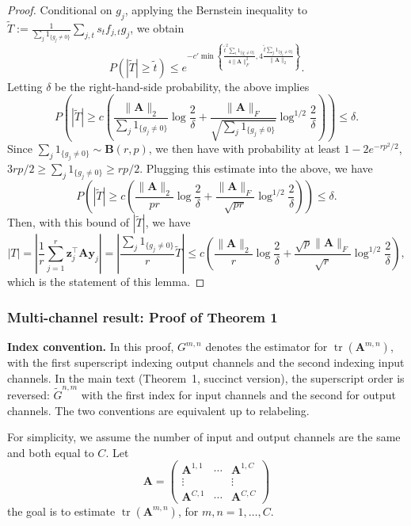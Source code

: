 \documentclass[10pt]{article}
\newcommand{\B}{\mathbf}
\begin{document}
\begin{proof}
Conditional on $g_j$, applying the Bernstein inequality to $\tilde{T}:= \frac{1}{\sum_j 1_{\{g_j\neq 0\}} }\sum_{j,t} s_t f_{j,t} g_j$, we obtain
\[
 P(| \tilde{T}| \geq \tilde{t}) \leq e^{-c'\min\left\{ \frac{\tilde{t}^2\sum_i 1_{\{g_i\neq 0\}}}{4\|\B{A}\|_F^2}, 4\frac{\tilde{t}\sum_j 1_{\{g_j\neq 0\}} }{ \|\B{A}\|_2}\right\}}.
\]
Letting $\delta$ be the right-hand-side probability, the above implies
\[
 P\left(| \tilde{T}| \geq c \left( \frac{\|\B{A}\|_2}{\sum_j 1_{\{g_j\neq 0\}} }\log \frac{2}{\delta} + \frac{\|\B{A}\|_F}{\sqrt {\sum_j 1_{\{g_j\neq 0\}} }}\log^{1/2} \frac{2}{\delta}\right)\right) \leq \delta.
\]
 Since $\sum_j 1_{\{g_j\neq 0\}}\sim \B{B}(r,p)$, we then have with probability at least $1-2e^{-rp^2/2}$, $3rp/2\geq \sum_j 1_{\{g_j\neq 0\}} \geq rp/2$. Plugging this estimate into the above, we have
 \[
 P\left(| \tilde{T}| \geq c \left( \frac{\|\B{A}\|_2}{pr }\log \frac{2}{\delta} + \frac{\|\B{A}\|_F}{\sqrt {pr }}\log^{1/2} \frac{2}{\delta}\right)\right) \leq \delta.
\]
Then, with this bound of $|\tilde{T}|$, we have
\[
|T| = \left|\frac{1}{r} \sum\limits_{j=1}^{r} \B{z}_j^{\top}\B{A}\B{y}_j \right| = \left|\frac{ \sum_j 1_{\{g_j\neq 0\}}}{r} \tilde{T}\right|\leq c\left( \frac{\|\B{A}\|_2}{r }\log \frac{2}{\delta} + \frac{\sqrt p \|\B{A}\|_F}{\sqrt {r }}\log^{1/2} \frac{2}{\delta}\right),
\]
which is the statement of this lemma.
\end{proof}

\subsubsection{Multi-channel result: Proof of Theorem 1}
\textbf{Index convention.} In this proof, $G^{m,n}$ denotes the estimator for $\operatorname{tr}(\B{A}^{m,n})$, with the first superscript indexing output channels and the second indexing input channels. In the main text (Theorem~1, succinct version), the superscript order is reversed: $\widetilde{G}^{n,m}$ with the first index for input channels and the second for output channels. The two conventions are equivalent up to relabeling.

For simplicity, we assume the number of input and output channels are the same and both equal to $C$. Let
\[
\B{A} = \left( \begin{matrix}\B{A}^{1,1} & \cdots& \B{A}^{1,C} \\ \vdots & & \vdots \\ \B{A}^{C,1} & \cdots & \B{A}^{C,C} \end{matrix}\right)
\]
the goal is to estimate $\operatorname{tr}(\B{A}^{m,n})$, for $m,n=1,\ldots,C$.
\end{document}
